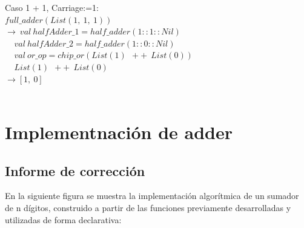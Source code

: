\documentclass[12pt, a4paper]{article}
\begin{document}
Caso 1 + 1, Carriage:=1:\\
$full\_adder(List(1,~1,~1))$\\
$\rightarrow~val~halfAdder\_1 = half\_adder(1::1::Nil)$ \\
$~~~~~val~halfAdder\_2 = half\_adder(1::0::Nil)$ \\
$~~~~~val~or\_op = chip\_or(List(1)~~++~~List(0))$ \\
$~~~~~List(1)~~++~~List(0)$ \\
$\rightarrow [1,~0]$\\ \\

\section{Implementnación de adder}
\subsection{Informe de corrección}
En la siguiente figura se muestra la implementación algorítmica de un sumador de n dígitos, construido a partir de las funciones previamente desarrolladas y utilizadas de forma declarativa: \\[16pt]
\end{document}
